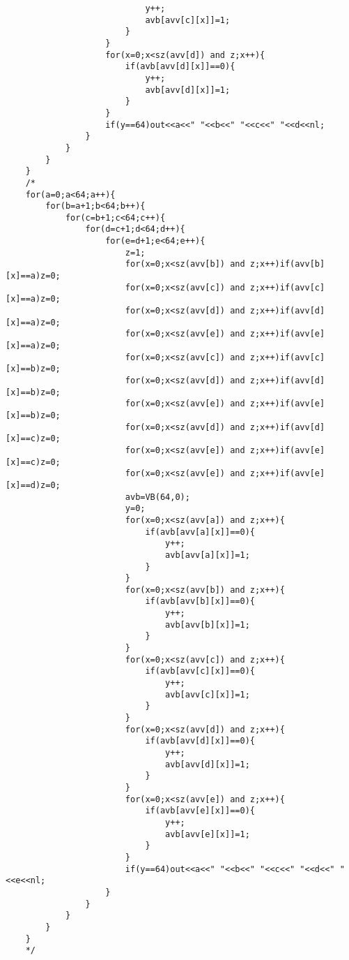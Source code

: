 \begin{verbatim}
							y++;
							avb[avv[c][x]]=1;
						}
					}
					for(x=0;x<sz(avv[d]) and z;x++){
						if(avb[avv[d][x]]==0){
							y++;
							avb[avv[d][x]]=1;
						}
					}
					if(y==64)out<<a<<" "<<b<<" "<<c<<" "<<d<<nl;
				}
			}
		}
	}
	/*
	for(a=0;a<64;a++){
		for(b=a+1;b<64;b++){
			for(c=b+1;c<64;c++){
				for(d=c+1;d<64;d++){
					for(e=d+1;e<64;e++){
						z=1;
						for(x=0;x<sz(avv[b]) and z;x++)if(avv[b][x]==a)z=0;
						for(x=0;x<sz(avv[c]) and z;x++)if(avv[c][x]==a)z=0;
						for(x=0;x<sz(avv[d]) and z;x++)if(avv[d][x]==a)z=0;
						for(x=0;x<sz(avv[e]) and z;x++)if(avv[e][x]==a)z=0;
						for(x=0;x<sz(avv[c]) and z;x++)if(avv[c][x]==b)z=0;
						for(x=0;x<sz(avv[d]) and z;x++)if(avv[d][x]==b)z=0;
						for(x=0;x<sz(avv[e]) and z;x++)if(avv[e][x]==b)z=0;
						for(x=0;x<sz(avv[d]) and z;x++)if(avv[d][x]==c)z=0;
						for(x=0;x<sz(avv[e]) and z;x++)if(avv[e][x]==c)z=0;
						for(x=0;x<sz(avv[e]) and z;x++)if(avv[e][x]==d)z=0;
						avb=VB(64,0);
						y=0;
						for(x=0;x<sz(avv[a]) and z;x++){
							if(avb[avv[a][x]]==0){
								y++;
								avb[avv[a][x]]=1;
							}
						}
						for(x=0;x<sz(avv[b]) and z;x++){
							if(avb[avv[b][x]]==0){
								y++;
								avb[avv[b][x]]=1;
							}
						}
						for(x=0;x<sz(avv[c]) and z;x++){
							if(avb[avv[c][x]]==0){
								y++;
								avb[avv[c][x]]=1;
							}
						}
						for(x=0;x<sz(avv[d]) and z;x++){
							if(avb[avv[d][x]]==0){
								y++;
								avb[avv[d][x]]=1;
							}
						}
						for(x=0;x<sz(avv[e]) and z;x++){
							if(avb[avv[e][x]]==0){
								y++;
								avb[avv[e][x]]=1;
							}
						}
						if(y==64)out<<a<<" "<<b<<" "<<c<<" "<<d<<" "<<e<<nl;
					}
				}
			}
		}
	}
	*/


\end{verbatim}
